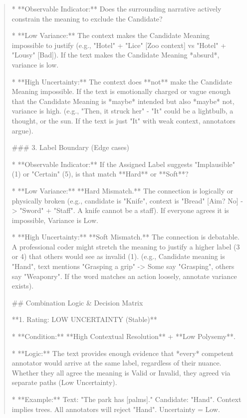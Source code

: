 \begin{quote}
*   **Observable Indicator:** Does the surrounding narrative actively constrain the meaning to exclude the Candidate?

    *   **Low Variance:** The context makes the Candidate Meaning impossible to justify (e.g., "Hotel" + "Lice" [Zoo context] vs "Hotel" + "Lousy" [Bad]). If the text makes the Candidate Meaning *absurd*, variance is low.

    *   **High Uncertainty:** The context does **not** make the Candidate Meaning impossible. If the text is emotionally charged or vague enough that the Candidate Meaning is *maybe* intended but also *maybe* not, variance is high. (e.g., "Then, it struck her" - "It" could be a lightbulb, a thought, or the sun. If the text is just "It" with weak context, annotators argue).



### 3. Label Boundary (Edge cases)

*   **Observable Indicator:** If the Assigned Label suggests "Implausible" (1) or "Certain" (5), is that match **Hard** or **Soft**?

    *   **Low Variance:** **Hard Mismatch.** The connection is logically or physically broken (e.g., candidate is "Knife", context is "Bread" [Aim? No] -> "Sword" + "Staff". A knife cannot be a staff). If everyone agrees it is impossible, Variance is Low.

    *   **High Uncertainty:** **Soft Mismatch.** The connection is debatable. A professional coder might stretch the meaning to justify a higher label (3 or 4) that others would see as invalid (1). (e.g., Candidate meaning is "Hand", text mentions "Grasping a grip" -> Some say "Grasping", others say "Weaponry". If the word matches an action loosely, annotate variance exists).



## Combination Logic \& Decision Matrix



**1. Rating: LOW UNCERTAINTY (Stable)**

*   **Condition:** **High Contextual Resolution** + **Low Polysemy**.

*   **Logic:** The text provides enough evidence that *every* competent annotator would arrive at the same label, regardless of their nuance. Whether they all agree the meaning is Valid or Invalid, they agreed via separate paths (Low Uncertainty).

*   **Example:** Text: "The park has [palms]." Candidate: "Hand". Context implies trees. All annotators will reject "Hand". Uncertainty = Low.




\end{quote}
